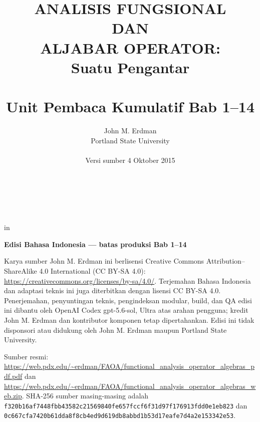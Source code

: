 \documentclass[11pt,reqno]{amsbook}
\theoremstyle{definition}
\theoremstyle{remark}
\numberwithin{equation}{section}
\begin{document}
 \frontmatter
 \title{ANALISIS FUNGSIONAL \\ DAN \\ ALJABAR OPERATOR: \\ Suatu Pengantar \\ \mbox{} \\ \large Unit Pembaca Kumulatif Bab 1--14}
 \author{John M. Erdman \\
      Portland State University \\
      \mbox{\hphantom{P}} \\
      Versi sumber 4 Oktober 2015 \\
      \mbox{\hphantom{P}} \\
      \mbox{\hphantom{P}} \\
            \mbox{\hphantom{P}} \\
                  \mbox{\hphantom{P}} }


 in


\maketitle


\begin{center}
\textbf{Edisi Bahasa Indonesia --- batas produksi Bab 1--14}
\end{center}

Karya sumber John M. Erdman ini berlisensi Creative Commons
Attribution--ShareAlike 4.0 International (CC BY-SA 4.0):
\url{https://creativecommons.org/licenses/by-sa/4.0/}.
Terjemahan Bahasa Indonesia dan adaptasi teknis ini juga diterbitkan dengan
lisensi CC BY-SA 4.0. Penerjemahan, penyuntingan teknis, pengindeksan modular,
build, dan QA edisi ini dibantu oleh OpenAI Codex gpt-5.6-sol, Ultra atas arahan
pengguna; kredit John M. Erdman dan kontributor komponen tetap dipertahankan.
Edisi ini tidak
disponsori atau didukung oleh John M. Erdman maupun Portland State University.

\begin{sloppypar}
Sumber resmi:
\url{https://web.pdx.edu/~erdman/FAOA/functional_analysis_operator_algebras_pdf.pdf}
dan
\url{https://web.pdx.edu/~erdman/FAOA/functional_analysis_operator_algebras_web.zip}.
SHA-256 sumber masing-masing adalah
\texttt{f320b16af7448fbb43582c21569840fe\allowbreak657fccf6f31d97f176913fdd0e1eb823}
dan
\texttt{0c667cfa7420b61dda8f8cb4ed9d619d\allowbreak b8abbd1b53d17eafe7d4a2e153342e53}.
\end{sloppypar}
\end{document}

